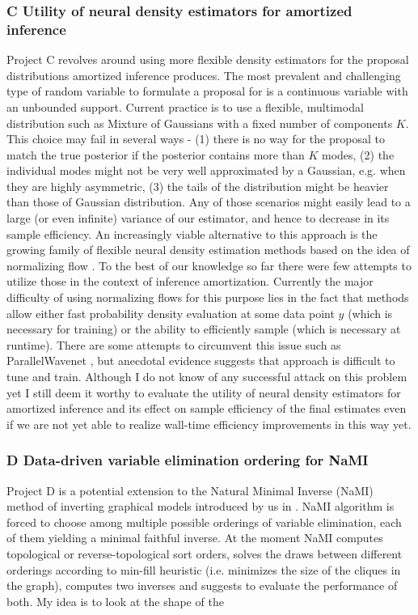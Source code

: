 \documentclass[12pt]{article}
\begin{document}
\subsubsection*{C \quad Utility of neural density estimators for amortized inference}
Project C revolves around using more flexible density estimators for the proposal distributions amortized inference produces.
The most prevalent and challenging type of random variable to formulate a proposal for is a continuous variable with an unbounded support.
Current practice is to use a flexible, multimodal distribution such as Mixture of Gaussians with a fixed number of components $K$.
This choice may fail in several ways - 
(1) there is no way for the proposal to match the true posterior if the posterior contains more than $K$ modes,
(2) the individual modes might not be very well approximated by a Gaussian, e.g. when they are highly asymmetric,
(3) the tails of the distribution might be heavier than those of Gaussian distribution.
Any of those scenarios might easily lead to a large (or even infinite) variance of our estimator, and hence to decrease in its sample efficiency.
An increasingly viable alternative to this approach is the growing family of flexible neural density estimation methods based on the idea of normalizing flow \citep{NFs}.
To the best of our knowledge so far there were few attempts to utilize those in the context of inference amortization.
Currently the major difficulty of using normalizing flows for this purpose lies in the fact that methods allow either fast probability density evaluation at some data point $y$ (which is necessary for training) or the ability to efficiently sample (which is necessary at runtime).
There are some attempts to circumvent this issue such as ParallelWavenet \citep{ParallelWavenet}, but anecdotal evidence suggests that approach is difficult to tune and train.
Although I do not know of any successful attack on this problem yet I still deem it worthy to evaluate the utility of neural density estimators for amortized inference and its effect on sample efficiency of the final estimates even if we are not yet able to realize wall-time efficiency improvements in this way yet.

\subsubsection*{D \quad Data-driven variable elimination ordering for NaMI}
Project D is a potential extension to the Natural Minimal Inverse (NaMI) method of inverting graphical models introduced by us in \citep{golinski2018uai}.
NaMI algorithm is forced to choose among multiple possible orderings of variable elimination, each of them yielding a minimal faithful inverse.
At the moment NaMI computes topological or reverse-topological sort orders, solves the draws between different orderings according to min-fill heuristic (i.e. minimizes the size of the cliques in the graph), computes two inverses and suggests to evaluate the performance of both.
My idea is to look at the shape of the 
\end{document}
